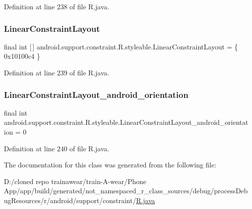 Definition at line 238 of file R.\+java.

\mbox{\label{classandroid_1_1support_1_1constraint_1_1_r_1_1styleable_a3d1d810f2c6279b4ff255b6cd87b7b52}} 
\subsubsection{\texorpdfstring{LinearConstraintLayout}{LinearConstraintLayout}}
{\footnotesize\ttfamily final int \mbox{[}$\,$\mbox{]} android.\+support.\+constraint.\+R.\+styleable.\+Linear\+Constraint\+Layout = \{ 0x10100c4 \}\hspace{0.3cm}{\ttfamily [static]}}



Definition at line 239 of file R.\+java.

\mbox{\label{classandroid_1_1support_1_1constraint_1_1_r_1_1styleable_ab75931ca103e38ee68ee432610b0520c}} 
\subsubsection{\texorpdfstring{LinearConstraintLayout\_android\_orientation}{LinearConstraintLayout\_android\_orientation}}
{\footnotesize\ttfamily final int android.\+support.\+constraint.\+R.\+styleable.\+Linear\+Constraint\+Layout\+\_\+android\+\_\+orientation = 0\hspace{0.3cm}{\ttfamily [static]}}



Definition at line 240 of file R.\+java.



The documentation for this class was generated from the following file\+:\begin{DoxyCompactItemize}
\item 
D\+:/cloned repo trainawear/train-\/\+A-\/wear/\+Phone App/app/build/generated/not\+\_\+namespaced\+\_\+r\+\_\+class\+\_\+sources/debug/process\+Debug\+Resources/r/android/support/constraint/\mbox{\hyperlink{process_debug_resources_2r_2android_2support_2constraint_2_r_8java}{R.\+java}}\end{DoxyCompactItemize}
